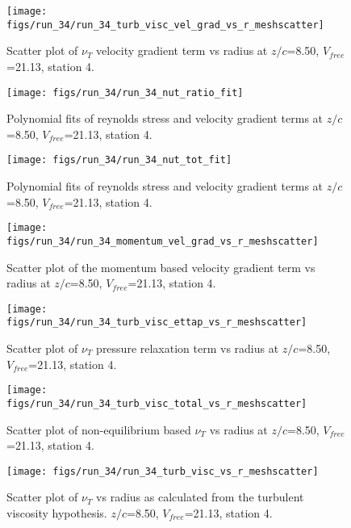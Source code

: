 \begin{figure}[H]
\centering
\texttt{[image: figs/run\_34/run\_34\_turb\_visc\_vel\_grad\_vs\_r\_meshscatter]}
\caption{Scatter plot of $\nu_T$ velocity gradient term vs radius at $z/c$=8.50, $V_{free}$=21.13, station 4.}
\end{figure}


\begin{figure}[H]
\centering
\texttt{[image: figs/run\_34/run\_34\_nut\_ratio\_fit]}
\caption{Polynomial fits of reynolds stress and velocity gradient terms at $z/c$=8.50, $V_{free}$=21.13, station 4.}
\end{figure}


\begin{figure}[H]
\centering
\texttt{[image: figs/run\_34/run\_34\_nut\_tot\_fit]}
\caption{Polynomial fits of reynolds stress and velocity gradient terms at $z/c$=8.50, $V_{free}$=21.13, station 4.}
\end{figure}


\begin{figure}[H]
\centering
\texttt{[image: figs/run\_34/run\_34\_momentum\_vel\_grad\_vs\_r\_meshscatter]}
\caption{Scatter plot of the momentum based velocity gradient term vs radius at $z/c$=8.50, $V_{free}$=21.13, station 4.}
\end{figure}


\begin{figure}[H]
\centering
\texttt{[image: figs/run\_34/run\_34\_turb\_visc\_ettap\_vs\_r\_meshscatter]}
\caption{Scatter plot of $\nu_T$ pressure relaxation term vs radius at $z/c$=8.50, $V_{free}$=21.13, station 4.}
\end{figure}


\begin{figure}[H]
\centering
\texttt{[image: figs/run\_34/run\_34\_turb\_visc\_total\_vs\_r\_meshscatter]}
\caption{Scatter plot of non-equilibrium based $\nu_T$ vs radius at $z/c$=8.50, $V_{free}$=21.13, station 4.}
\end{figure}


\begin{figure}[H]
\centering
\texttt{[image: figs/run\_34/run\_34\_turb\_visc\_vs\_r\_meshscatter]}
\caption{Scatter plot of $\nu_T$ vs radius as calculated from the turbulent viscosity hypothesis. $z/c$=8.50, $V_{free}$=21.13, station 4.}
\end{figure}


